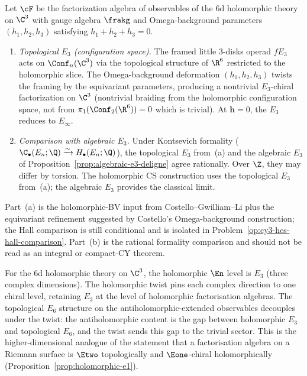 \begin{conjecture}
\label{conj:topological-e3-comparison}
\ClaimStatusConjectured
Let $\cF$ be the factorization algebra of observables of the 6d holomorphic theory on $\C^3$ with gauge algebra $\frakg$ and Omega-background parameters $(h_1, h_2, h_3)$ satisfying $h_1 + h_2 + h_3 = 0$.
\begin{enumerate}[label=\textup{(\alph*)}]
 \item \emph{Topological $E_3$ (configuration space).}
 The framed little $3$-disks operad $fE_3$ acts on $\Conf_n(\C^3)$ via the topological structure of $\R^6$ restricted to the holomorphic slice. The Omega-background deformation $(h_1, h_2, h_3)$ twists the framing by the equivariant parameters, producing a nontrivial $E_3$-chiral factorization on $\C^3$ (nontrivial braiding from the holomorphic configuration space, not from $\pi_1(\Conf_2(\R^6)) = 0$ which is trivial). At $\boldsymbol{h} = 0$, the $E_3$ reduces to $E_\infty$.

 \item \emph{Comparison with algebraic $E_3$.}
 Under Kontsevich formality ($\C_\bullet(E_n; \Q) \xrightarrow{\sim} H_\bullet(E_n; \Q)$), the topological $E_3$ from~(a) and the algebraic $E_3$ of Proposition~\ref{prop:algebraic-e3-deligne} agree rationally. Over $\Z$, they may differ by torsion. The holomorphic CS construction uses the topological $E_3$ from~(a); the algebraic $E_3$ provides the classical limit.
\end{enumerate}
Part~(a) is the holomorphic-BV input from Costello--Gwilliam--Li plus the equivariant refinement suggested by Costello's Omega-background construction; the Hall comparison is still conditional and is isolated in Problem~\ref{op:cy3-hcs-hall-comparison}. Part~(b) is the rational formality comparison and should not be read as an integral or compact-CY theorem.
\end{conjecture}

\begin{remark}
\label{rem:why-e3-not-higher}
For the 6d holomorphic theory on $\C^3$, the holomorphic $\En$ level
is $E_3$ (three complex dimensions). The holomorphic twist pins each
complex direction to one chiral level, retaining $E_3$ at the level
of holomorphic factorisation algebras. The topological $E_6$
structure on the antiholomorphic-extended observables decouples under
the twist: the antiholomorphic content is the gap between holomorphic
$E_3$ and topological $E_6$, and the twist sends this gap to the
trivial sector. This is the higher-dimensional analogue of the
statement that a factorisation algebra on a Riemann surface is
$\Etwo$ topologically and $\Eone$-chiral holomorphically
(Proposition~\ref{prop:holomorphic-e1}).
\end{remark}

